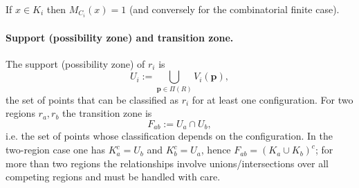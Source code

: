 \documentclass{article}
\begin{document}
If \(x\in K_i\) then \(M_{C_i}(x)=1\) (and conversely for the combinatorial finite case).

\paragraph{Support (possibility zone) and transition zone.} The support (possibility zone) of \(r_i\) is
\[
U_i := \bigcup_{\mathbf p\in\Pi(R)} V_i(\mathbf p),
\]
the set of points that can be classified as \(r_i\) for at least one configuration. For two regions \(r_a,r_b\) the transition zone is
\[
F_{ab} := U_a\cap U_b,
\]
i.e. the set of points whose classification depends on the configuration. In the two-region case one has \(K_a^c = U_b\) and \(K_b^c = U_a\), hence \(F_{ab}=(K_a\cup K_b)^c\); for more than two regions the relationships involve unions/intersections over all competing regions and must be handled with care.
\end{document}

